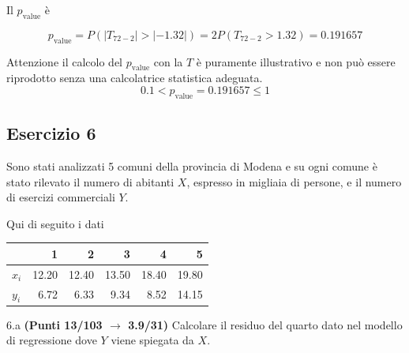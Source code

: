 \documentclass[
  11pt,
]{book}
\theoremstyle{mytheoremstyle}
\theoremstyle{mydefstyle}
\newenvironment{sol}
  {
  \begin{tcolorbox}[enhanced,breakable,arc=0.1mm,boxrule=1pt,colback=white,colframe=iblue,
  title=\bf \fontfamily{lmss}\selectfont \hspace{.5 cm} Soluzione,drop fuzzy shadow]

}{
\end{tcolorbox}
  }
\begin{document}
\begin{sol}
Il \(p_{\text{value}}\) è

\[ p_{\text{value}} = P(|T_{72-2}|>|-1.32|)=2P(T_{72-2}>1.32)=0.191657 \]

Attenzione il calcolo del \(p_\text{value}\) con la \(T\) è puramente illustrativo e non può essere riprodotto senza una calcolatrice statistica adeguata.\[
 0.1 < p_\text{value}= 0.191657 \leq 1 
\]

\end{sol}

\subsection{Esercizio 6}\label{esercizio-6-11}

Sono stati analizzati 5 comuni della provincia di Modena e su ogni comune è stato rilevato
il numero di abitanti \(X\), espresso in migliaia di persone, e il numero di esercizi commerciali \(Y\).

Qui di seguito i dati

\begin{table}[H]
\centering
\begin{tabular}{lrrrrr}
\toprule
  & 1 & 2 & 3 & 4 & 5\\
\midrule
$x_i$ & 12.20 & 12.40 & 13.50 & 18.40 & 19.80\\
$y_i$ & 6.72 & 6.33 & 9.34 & 8.52 & 14.15\\
\bottomrule
\end{tabular}
\end{table}

6.a \textbf{(Punti 13/103 \(\rightarrow\) 3.9/31)} Calcolare il residuo del quarto dato nel modello di regressione dove \(Y\) viene spiegata da \(X\).
\end{document}
